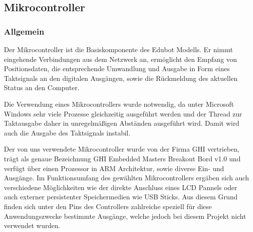 \subsection{Mikrocontroller}
\subsubsection{Allgemein}
Der Mikrocontroller ist die Basiskomponente des Edubot Modells. Er nimmt eingehende Verbindungen aus dem Netzwerk an, ermöglicht den Empfang von Positionsdaten, die entsprechende Umwandlung und Ausgabe in Form eines Taktsignals an den digitalen Ausgängen, sowie die Rückmeldung des aktuellen Status an den Computer.

Die Verwendung eines Mikrocontrollers wurde notwendig, da unter Microsoft Windows sehr viele Prozesse gleichzeitig ausgeführt werden und der Thread zur Taktausgabe daher in unregelmäßigen Abständen ausgeführt wird. Damit wird auch die Ausgabe des Taktsignals instabil.

Der von uns verwendete Mikrocontroller wurde von der Firma GHI vertrieben, trägt als genaue Bezeichnung GHI Embedded Masters Breakout Bord v1.0 und verfügt über einen Prozessor in ARM Architektur, sowie diverse Ein- und Ausgänge. Im Funktionsumfang des gewählten Mikrocontrollers ergäben sich auch verschiedene Möglichkeiten wie der direkte Anschluss eines LCD Pannels oder auch externer persistenter Speichermedien wie USB Sticks. Aus diesem Grund finden sich unter den Pins des Controllers zahlreiche speziell für diese Anwendungszwecke bestimmte Ausgänge, welche jedoch bei diesem Projekt nicht verwendet wurden.


